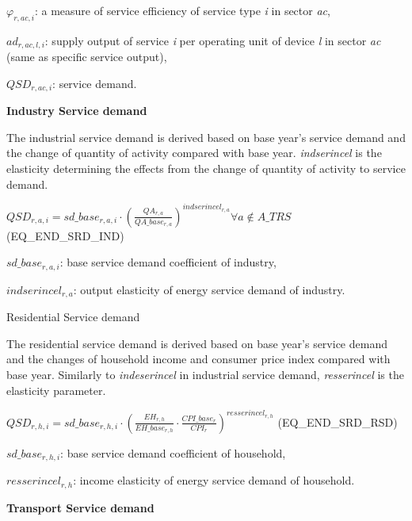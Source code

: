 \documentclass[10pt,a4paper,titlepage,dvipdfmx]{book}
\begin{document}
\begin{flushleft}
$\varphi_{r,ac,i}$: a measure of service efficiency of service type \textit{i} in sector \textit{ac},

$ad_{r,ac,l,i}$: supply output of service \textit{i} per operating unit of device \textit{l} in sector \textit{ac} (same as specific service output),

$QSD_{r,ac,i}$: service demand.
\end{flushleft}

\begin{flushleft}\textbf{Industry Service demand}\end{flushleft}

The industrial service demand is derived based on base year's service demand and the change of quantity of activity compared with base year. \textit{indserincel} is the elasticity determining the effects from the change of quantity of activity to service demand.

$QSD_{r,a,i}=sd\_ base_{r,a,i}\cdot \left(\frac{QA_{r,a}}{QA\_ base_{r,a}}\right)^{indserince{l_{r,a}}}\forall a\notin A\_ TRS$ (EQ\_END\_SRD\_IND)

\begin{flushleft}
$sd\_ base_{r,a,i}$: base service demand coefficient of industry,

$indserincel_{r,a}$: output elasticity of energy service demand of industry.
\end{flushleft}

\begin{flushleft}Residential Service demand\end{flushleft}

The residential service demand is derived based on base year's service demand and the changes of household income and consumer price index compared with base year. Similarly to \textit{indeserincel} in industrial service demand, \textit{resserincel} is the elasticity parameter. 

$QSD_{r,h,i}=sd\_ base_{r,h,i}\cdot \left(\frac{EH_{r,h}}{EH\_ base_{r,h}}\cdot \frac{CPI\_ base_{r}}{CPI_{r}}\right)^{resserincel_{r,h}}$   (EQ\_END\_SRD\_RSD)

\begin{flushleft}
$sd\_ base_{r,h,i}$: base service demand coefficient of household,

$resserincel_{r,h}$: income elasticity of energy service demand of household.
\end{flushleft}

\begin{flushleft}\textbf{Transport Service demand}\end{flushleft}
\end{document}
